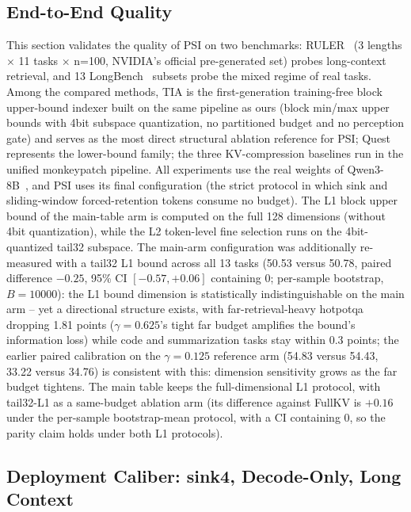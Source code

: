 \documentclass[11pt]{article}
\begin{document}
\subsection{End-to-End Quality}

This section validates the quality of PSI on two benchmarks: RULER~\cite{ruler} (3 lengths $\times$ 11 tasks $\times$ n=100, NVIDIA's official pre-generated set) probes long-context retrieval, and 13 LongBench~\cite{longbench} subsets probe the mixed regime of real tasks. Among the compared methods, TIA is the first-generation training-free block upper-bound indexer built on the same pipeline as ours (block min/max upper bounds with 4bit subspace quantization, no partitioned budget and no perception gate) and serves as the most direct structural ablation reference for PSI; Quest represents the lower-bound family; the three KV-compression baselines run in the unified monkeypatch pipeline. All experiments use the real weights of Qwen3-8B~\cite{qwen3}, and PSI uses its final configuration (the strict protocol in which sink and sliding-window forced-retention tokens consume no budget). The L1 block upper bound of the main-table arm is computed on the full 128 dimensions (without 4bit quantization), while the L2 token-level fine selection runs on the 4bit-quantized tail32 subspace. The main-arm configuration was additionally re-measured with a tail32 L1 bound across all 13 tasks (50.53 versus 50.78, paired difference $-0.25$, 95\% CI $[-0.57, +0.06]$ containing 0; per-sample bootstrap, $B{=}10000$): the L1 bound dimension is statistically indistinguishable on the main arm -- yet a directional structure exists, with far-retrieval-heavy hotpotqa dropping 1.81 points ($\gamma{=}0.625$'s tight far budget amplifies the bound's information loss) while code and summarization tasks stay within 0.3 points; the earlier paired calibration on the $\gamma{=}0.125$ reference arm (54.83 versus 54.43, 33.22 versus 34.76) is consistent with this: dimension sensitivity grows as the far budget tightens. The main table keeps the full-dimensional L1 protocol, with tail32-L1 as a same-budget ablation arm (its difference against FullKV is $+0.16$ under the per-sample bootstrap-mean protocol, with a CI containing 0, so the parity claim holds under both L1 protocols).

\subsection{Deployment Caliber: sink4, Decode-Only, Long Context}\label{sec:caliber}
\end{document}
